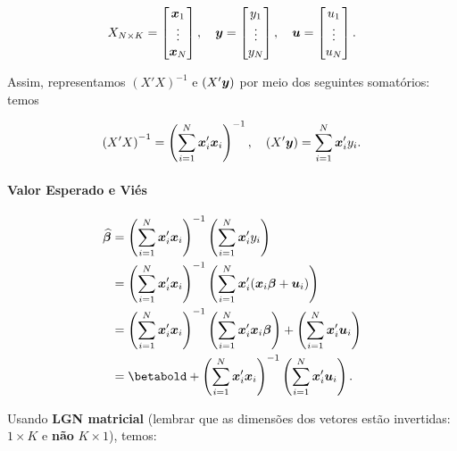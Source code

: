 \documentclass[11pt,oneside,a4paper]{article}
\numberwithin{equation}{section}
\begin{document}
\vspace{-1 em}
\begin{align*}
X_{N \times K} =
\begin{bmatrix}
	\boldsymbol{x}_{1} \\ \vdots \\	\boldsymbol{x}_{N}	
\end{bmatrix},
\quad
\boldsymbol{y} =
\begin{bmatrix}
	y_{1} \\ \vdots \\ y_{N}
\end{bmatrix},
\quad
\boldsymbol{u} =
\begin{bmatrix}
	u_{1} \\ \vdots \\ u_{N}
\end{bmatrix}.
\end{align*}

\noindent
Assim, representamos $(X'X)^{-1}$ e $(X'\boldsymbol{y})$ por meio dos seguintes somatórios:
temos

\vspace{-1 em}
\begin{align*}
\left( X'X \right)^{-1} = \left( \sum_{i=1}^{N} \boldsymbol{x}_{i}' \boldsymbol{x}_{i} \right)^{-1} ,
\quad
\left( X'\boldsymbol{y} \right) = \sum_{i=1}^{N} \boldsymbol{x}_{i}' y_{i}.
\end{align*}

\paragraph{Valor Esperado e Viés}

\begin{align*}
\betahatbold &= 
\left( \sum_{i=1}^{N} \mbs{x}_{i}' \mbs{x}_{i} \right)^{-1}
\left( \sum_{i=1}^{N} \mbs{x}_{i}' y_{i} \right)
\\
&=
\left( \sum_{i=1}^{N} \mbs{x}_{i}' \mbs{x}_{i} \right)^{-1}
\left( \sum_{i=1}^{N} \mbs{x}_{i}' (\mbs{x}_{i} \mbs{\beta} + \mbs{u}_{i}) \right)
\\
&=
\left( \sum_{i=1}^{N} \mbs{x}_{i}' \mbs{x}_{i} \right)^{-1}
\left( \sum_{i=1}^{N} \mbs{x}_{i}' \mbs{x}_{i} \mbs{\beta} \right) +
\left( \sum_{i=1}^{N} \mbs{x}_{i}' \mbs{u}_{i} \right)
\\
&=
\betabold +
\left( \sum_{i=1}^{N} \mbs{x}_{i}' \mbs{x}_{i} \right)^{-1}
\left( \sum_{i=1}^{N} \mbs{x}_{i}' \mbs{u}_{i} \right).
\end{align*}

\noindent
Usando \textbf{LGN matricial} (lembrar que as dimensões dos vetores estão invertidas: $1 \times K$ e \textbf{não} $K \times 1$), temos:
\end{document}
